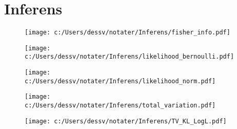 \chapter{Inferens} 
\begin{figure} 
\texttt{[image: c:/Users/dessv/notater/Inferens/fisher\_info.pdf]} 
\end{figure} 
\begin{figure} 
\texttt{[image: c:/Users/dessv/notater/Inferens/likelihood\_bernoulli.pdf]} 
\end{figure} 
\begin{figure} 
\texttt{[image: c:/Users/dessv/notater/Inferens/likelihood\_norm.pdf]} 
\end{figure} 
\begin{figure} 
\texttt{[image: c:/Users/dessv/notater/Inferens/total\_variation.pdf]} 
\end{figure} 
\begin{figure} 
\texttt{[image: c:/Users/dessv/notater/Inferens/TV\_KL\_LogL.pdf]} 
\end{figure} 

